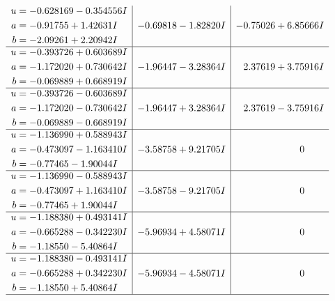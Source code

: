 \documentclass[1p]{elsarticle_modified}
\theoremstyle{definition}
\begin{document}
$$\begin{array}{c|c|c}
\begin{aligned}
u &= -0.628169 - 0.354556 I \\
a &= -0.91755 + 1.42631 I \\
b &= -2.09261 + 2.20942 I\end{aligned}
 & -0.69818 - 1.82820 I & -0.75026 + 6.85666 I \\ \hline\begin{aligned}
u &= -0.393726 + 0.603689 I \\
a &= -1.172020 + 0.730642 I \\
b &= -0.069889 + 0.668919 I\end{aligned}
 & -1.96447 - 3.28364 I & \phantom{-}2.37619 + 3.75916 I \\ \hline\begin{aligned}
u &= -0.393726 - 0.603689 I \\
a &= -1.172020 - 0.730642 I \\
b &= -0.069889 - 0.668919 I\end{aligned}
 & -1.96447 + 3.28364 I & \phantom{-}2.37619 - 3.75916 I \\ \hline\begin{aligned}
u &= -1.136990 + 0.588943 I \\
a &= -0.473097 - 1.163410 I \\
b &= -0.77465 - 1.90044 I\end{aligned}
 & -3.58758 + 9.21705 I & \phantom{-0.000000 } 0 \\ \hline\begin{aligned}
u &= -1.136990 - 0.588943 I \\
a &= -0.473097 + 1.163410 I \\
b &= -0.77465 + 1.90044 I\end{aligned}
 & -3.58758 - 9.21705 I & \phantom{-0.000000 } 0 \\ \hline\begin{aligned}
u &= -1.188380 + 0.493141 I \\
a &= -0.665288 - 0.342230 I \\
b &= -1.18550 - 5.40864 I\end{aligned}
 & -5.96934 + 4.58071 I & \phantom{-0.000000 } 0 \\ \hline\begin{aligned}
u &= -1.188380 - 0.493141 I \\
a &= -0.665288 + 0.342230 I \\
b &= -1.18550 + 5.40864 I\end{aligned}
 & -5.96934 - 4.58071 I & \phantom{-0.000000 } 0\\
 \hline 
 \end{array}$$\newpage$$\begin{array}{c|c|c}  

\end{array}$$
\end{document}
